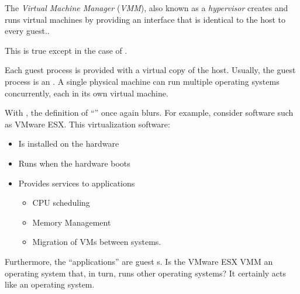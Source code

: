 \begin{definition}\label{def:Virtual_Machine_Manager}\label{def:Hypervisor}\label{def:VMM}
  The \emph{Virtual Machine Manager} (\emph{VMM}), also known as a \emph{hypervisor} creates and runs virtual machines by providing an interface that is identical to the host to every guest..
  \begin{remark}
    This is true except in the case of .
  \end{remark}
\end{definition}

Each guest process is provided with a virtual copy of the host.
Usually, the guest process is an .
A single physical machine can run multiple operating systems concurrently, each in its own virtual machine.

With , the definition of ``'' once again blurs.
For example, consider  software such as VMware ESX.\@
This virtualization software:
\begin{itemize}[noitemsep]
\item Is installed on the hardware
\item Runs when the hardware boots
\item Provides services to applications
  \begin{itemize}[noitemsep]
  \item CPU scheduling
  \item Memory Management
  \item Migration of VMs between systems.
  \end{itemize}
\end{itemize}

Furthermore, the ``applications'' are guest s.
Is the VMware ESX VMM an operating system that, in turn, runs other operating systems?
It certainly acts like an operating system.

